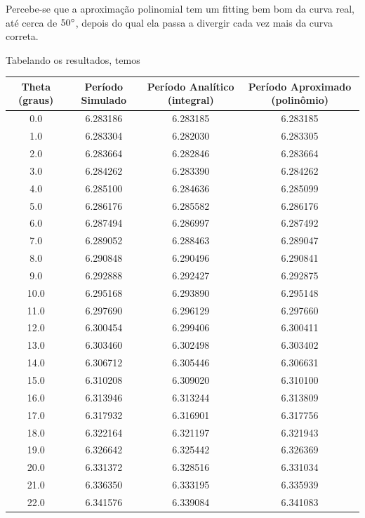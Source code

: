 \documentclass[12pt,a4paper]{article}
\begin{document}
Percebe-se que a aproximação polinomial tem um fitting bem bom da curva real, até cerca de $50\degree$, depois do qual ela passa a divergir cada vez mais da curva correta.

Tabelando os resultados, temos 

\begin{table}[H]
\begin{center}
\begin{tabular}{|c|c|c|c|}
\hline
Theta (graus) & Período Simulado & Período Analítico (integral) & Período Aproximado (polinômio) \\
\hline
0.0 & 6.283186 & 6.283185 & 6.283185 \\
\hline
1.0 & 6.283304 & 6.282030 & 6.283305 \\
\hline
2.0 & 6.283664 & 6.282846 & 6.283664 \\
\hline
3.0 & 6.284262 & 6.283390 & 6.284262 \\
\hline
4.0 & 6.285100 & 6.284636 & 6.285099 \\
\hline
5.0 & 6.286176 & 6.285582 & 6.286176 \\
\hline
6.0 & 6.287494 & 6.286997 & 6.287492 \\
\hline
7.0 & 6.289052 & 6.288463 & 6.289047 \\
\hline
8.0 & 6.290848 & 6.290496 & 6.290841 \\
\hline
9.0 & 6.292888 & 6.292427 & 6.292875 \\
\hline
10.0 & 6.295168 & 6.293890 & 6.295148 \\
\hline
11.0 & 6.297690 & 6.296129 & 6.297660 \\
\hline
12.0 & 6.300454 & 6.299406 & 6.300411 \\
\hline
13.0 & 6.303460 & 6.302498 & 6.303402 \\
\hline
14.0 & 6.306712 & 6.305446 & 6.306631 \\
\hline
15.0 & 6.310208 & 6.309020 & 6.310100 \\
\hline
16.0 & 6.313946 & 6.313244 & 6.313809 \\
\hline
17.0 & 6.317932 & 6.316901 & 6.317756 \\
\hline
18.0 & 6.322164 & 6.321197 & 6.321943 \\
\hline
19.0 & 6.326642 & 6.325442 & 6.326369 \\
\hline
20.0 & 6.331372 & 6.328516 & 6.331034 \\
\hline
21.0 & 6.336350 & 6.333195 & 6.335939 \\
\hline
22.0 & 6.341576 & 6.339084 & 6.341083 \\

\end{tabular}
\end{center}
\end{table}
\end{document}
